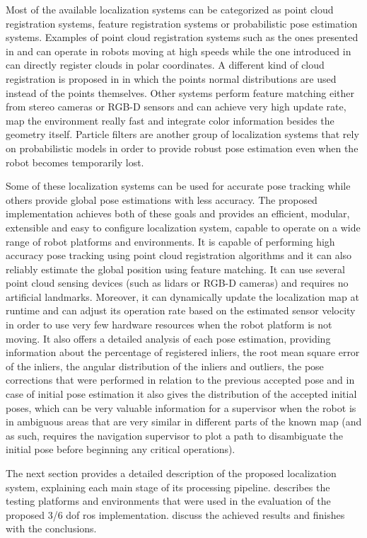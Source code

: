 Most of the available localization systems can be categorized as point cloud registration systems, feature registration systems or probabilistic pose estimation systems. Examples of point cloud registration systems such as the ones presented in \cite{Lingemann2005} and \cite{Pomerleau2013} can operate in robots moving at high speeds while the one introduced in \cite{Diosi2005} can directly register clouds in polar coordinates. A different kind of cloud registration is proposed in \cite{Magnusson2009} in which the points normal distributions are used instead of the points themselves. Other systems perform feature matching either from stereo cameras \cite{Kitt2010} or RGB-D sensors \cite{Whelan2013a} and can achieve very high update rate, map the environment really fast and integrate color information besides the geometry itself. Particle filters \cite{Thrun2002} are another group of localization systems that rely on probabilistic models in order to provide robust pose estimation even when the robot becomes temporarily lost.

Some of these localization systems can be used for accurate pose tracking while others provide global pose estimations with less accuracy. The proposed implementation achieves both of these goals and provides an efficient, modular, extensible and easy to configure localization system, capable to operate on a wide range of robot platforms and environments. It is capable of performing high accuracy pose tracking using point cloud registration algorithms and it can also reliably estimate the global position using feature matching. It can use several point cloud sensing devices (such as \glspl{lidar} or RGB-D cameras) and requires no artificial landmarks. Moreover, it can dynamically update the localization map at runtime and can adjust its operation rate based on the estimated sensor velocity in order to use very few hardware resources when the robot platform is not moving. It also offers a detailed analysis of each pose estimation, providing information about the percentage of registered inliers, the root mean square error of the inliers, the angular distribution of the inliers and outliers, the pose corrections that were performed in relation to the previous accepted pose and in case of initial pose estimation it also gives the distribution of the accepted initial poses, which can be very valuable information for a supervisor when the robot is in ambiguous areas that are very similar in different parts of the known map (and as such, requires the navigation supervisor to plot a path to disambiguate the initial pose before beginning any critical operations).

The next section provides a detailed description of the proposed localization system, explaining each main stage of its processing pipeline.  describes the testing platforms and environments that were used in the evaluation of the proposed 3/6 \gls{dof} \gls{ros} implementation.  discuss the achieved results and  finishes with the conclusions.
